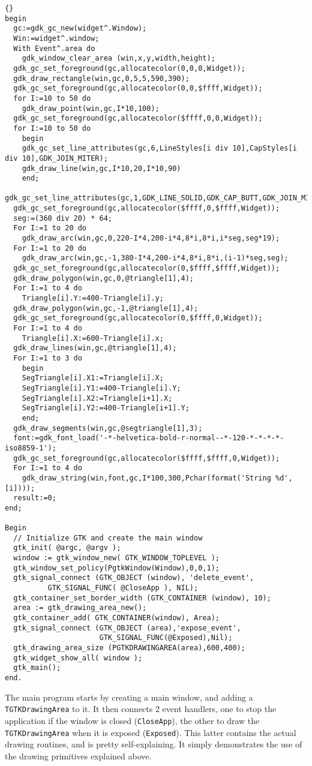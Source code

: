 \documentclass[10pt]{article}
\newcommand{\var}[1]{\texttt{#1}}
\begin{document}
\begin{lstlisting}{}
begin
  gc:=gdk_gc_new(widget^.Window);
  Win:=widget^.window;
  With Event^.area do
    gdk_window_clear_area (win,x,y,width,height);
  gdk_gc_set_foreground(gc,allocatecolor(0,0,0,Widget));
  gdk_draw_rectangle(win,gc,0,5,5,590,390);
  gdk_gc_set_foreground(gc,allocatecolor(0,0,$ffff,Widget));
  for I:=10 to 50 do
    gdk_draw_point(win,gc,I*10,100);
  gdk_gc_set_foreground(gc,allocatecolor($ffff,0,0,Widget));
  for I:=10 to 50 do
    begin
    gdk_gc_set_line_attributes(gc,6,LineStyles[i div 10],CapStyles[i div 10],GDK_JOIN_MITER);
    gdk_draw_line(win,gc,I*10,20,I*10,90)
    end;
  gdk_gc_set_line_attributes(gc,1,GDK_LINE_SOLID,GDK_CAP_BUTT,GDK_JOIN_MITER);
  gdk_gc_set_foreground(gc,allocatecolor($ffff,0,$ffff,Widget));
  seg:=(360 div 20) * 64;
  For I:=1 to 20 do
    gdk_draw_arc(win,gc,0,220-I*4,200-i*4,8*i,8*i,i*seg,seg*19);
  For I:=1 to 20 do
    gdk_draw_arc(win,gc,-1,380-I*4,200-i*4,8*i,8*i,(i-1)*seg,seg);
  gdk_gc_set_foreground(gc,allocatecolor(0,$ffff,$ffff,Widget));
  gdk_draw_polygon(win,gc,0,@triangle[1],4);  
  For I:=1 to 4 do
    Triangle[i].Y:=400-Triangle[i].y;
  gdk_draw_polygon(win,gc,-1,@triangle[1],4);  
  gdk_gc_set_foreground(gc,allocatecolor(0,$ffff,0,Widget));
  For I:=1 to 4 do
    Triangle[i].X:=600-Triangle[i].x;
  gdk_draw_lines(win,gc,@triangle[1],4);
  For I:=1 to 3 do
    begin
    SegTriangle[i].X1:=Triangle[i].X;
    SegTriangle[i].Y1:=400-Triangle[i].Y;
    SegTriangle[i].X2:=Triangle[i+1].X;
    SegTriangle[i].Y2:=400-Triangle[i+1].Y;
    end;
  gdk_draw_segments(win,gc,@segtriangle[1],3);
  font:=gdk_font_load('-*-helvetica-bold-r-normal--*-120-*-*-*-*-iso8859-1');
  gdk_gc_set_foreground(gc,allocatecolor($ffff,$ffff,0,Widget));
  For I:=1 to 4 do
    gdk_draw_string(win,font,gc,I*100,300,Pchar(format('String %d',[i])));
  result:=0;
end;

Begin
  // Initialize GTK and create the main window
  gtk_init( @argc, @argv );
  window := gtk_window_new( GTK_WINDOW_TOPLEVEL );
  gtk_window_set_policy(PgtkWindow(Window),0,0,1);
  gtk_signal_connect (GTK_OBJECT (window), 'delete_event',
          GTK_SIGNAL_FUNC( @CloseApp ), NIL);
  gtk_container_set_border_width (GTK_CONTAINER (window), 10);
  area := gtk_drawing_area_new();
  gtk_container_add( GTK_CONTAINER(window), Area);
  gtk_signal_connect (GTK_OBJECT (area),'expose_event',
                      GTK_SIGNAL_FUNC(@Exposed),Nil);
  gtk_drawing_area_size (PGTKDRAWINGAREA(area),600,400);
  gtk_widget_show_all( window ); 
  gtk_main();
end.
\end{lstlisting}
The main program starts by creating a main window,
and adding a \var{TGTKDrawingArea} to it. It then connects 2 event handlers,
one to stop the application if the window is closed (\var{CloseApp}),  
the other to draw the \var{TGTKDrawingArea} when it is exposed 
(\var{Exposed}). This latter contains the actual drawing routines, and is
pretty self-explaining. It simply demonstrates the use of the drawing
primitives explained above.
\end{document}
